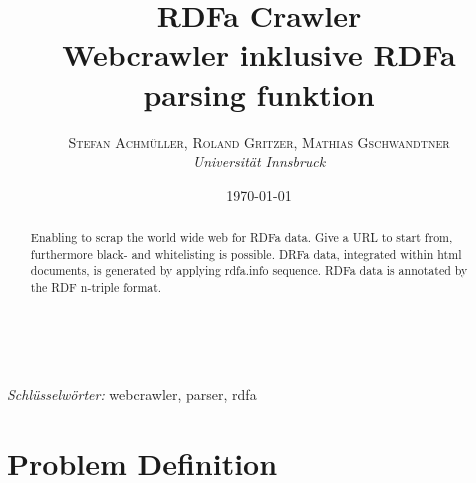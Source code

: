 \documentclass[hidelinks, a4paper, 11pt]{article} %
\title{\textbf{RDFa Crawler}\\ %
Webcrawler inklusive RDFa parsing funktion} %
\author{\textsc{Stefan Achm\"uller, Roland Gritzer, Mathias Gschwandtner} %
\\{\textit{Universit\"at Innsbruck}}} %
\date{\today} %
\makeatletter
\renewcommand{\maketitle}{ %
\begin{flushright} %
{\LARGE\@title} %

\vspace{50pt} %

{\large\@author} %
\\\@date %

\vspace{40pt} %
\end{flushright}
}
\makeatother
\begin{document}
\maketitle %



\renewcommand{\abstractname}{Zusammenfassung} %

\begin{abstract}
Enabling to scrap the world wide web for RDFa data. Give a URL to start from, furthermore black- and whitelisting is possible. DRFa data, integrated within html documents, is generated by applying rdfa.info sequence. RDFa data is annotated by the RDF n-triple format.
\end{abstract}

\hspace*{3,6mm}\textit{Schl\"usselw\"orter:} webcrawler, parser, rdfa %

\vspace{30pt} %

\renewcommand{\contentsname}{Inhaltsangabe}

\tableofcontents
\newpage





\section{Problem Definition}
\end{document}
